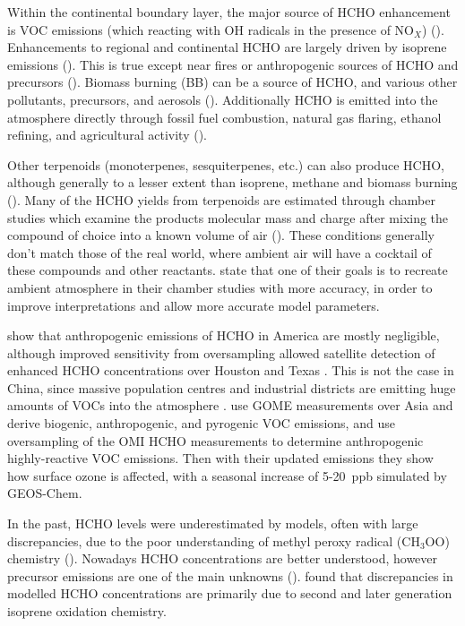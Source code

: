     Within the continental boundary layer, the major source of HCHO enhancement is VOC emissions (which reacting with OH radicals in the presence of NO$_X$) (\cite{Wagner2002, Millet2006, Kefauver2014}).
    Enhancements to regional and continental HCHO are largely driven by isoprene emissions (\cite{Guenther1995, Palmer2003, Shim2005, Kefauver2014}).
    This is true except near fires or anthropogenic sources of HCHO and precursors (\cite{Guenther1995, Kefauver2014, Wolfe2016}).
    Biomass burning (BB) can be a source of HCHO, and various other pollutants, precursors, and aerosols (\cite{Guenther1995, Andreae2001}).
    Additionally HCHO is emitted into the atmosphere directly through fossil fuel combustion, natural gas flaring, ethanol refining, and agricultural activity (\cite{Wolfe2016}).
    
    Other terpenoids (monoterpenes, sesquiterpenes, etc.) can also produce HCHO, although generally to a lesser extent than isoprene, methane and biomass burning (\cite{Guenther2012}).
    Many of the HCHO yields from terpenoids are estimated through chamber studies which examine the products molecular mass and charge after mixing the compound of choice into a known volume of air (\cite[eg.]{Nguyen2014}).
    These conditions generally don't match those of the real world, where ambient air will have a cocktail of these compounds and other reactants.
    \cite{Nguyen2014} state that one of their goals is to recreate ambient atmosphere in their chamber studies with more accuracy, in order to improve interpretations and allow more accurate model parameters.
    
    \cite{Millet2008} show that anthropogenic emissions of HCHO in America are mostly negligible, although improved sensitivity from oversampling allowed satellite detection of enhanced HCHO concentrations over Houston and Texas \citep{Zhu2014}.
    This is not the case in China, since massive population centres and industrial districts are emitting huge amounts of VOCs into the atmosphere \citep{Fu2007}.
    \cite{Fu2007} use GOME measurements over Asia and derive biogenic, anthropogenic, and pyrogenic VOC emissions, and \cite{Zhu2014} use oversampling of the OMI HCHO measurements to determine anthropogenic highly-reactive VOC emissions.
    Then with their updated emissions they show how surface ozone is affected, with a seasonal increase of 5-20~ppb simulated by GEOS-Chem.
    
    In the past, HCHO levels were underestimated by models, often with large discrepancies, due to the poor understanding of methyl peroxy radical (CH$_3$OO) chemistry (\cite{Wagner2002}).
    Nowadays HCHO concentrations are better understood, however precursor emissions are one of the main unknowns (\cite[eg.]{Emmerson2016,Marvin2017}).
    \cite{Marvin2017} found that discrepancies in modelled HCHO concentrations are primarily due to second and later generation isoprene oxidation chemistry.
    

